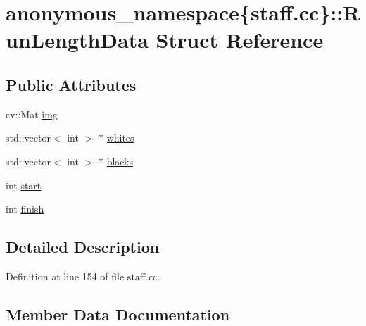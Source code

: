 \hypertarget{structanonymous__namespace_02staff_8cc_03_1_1RunLengthData}{}\section{anonymous\+\_\+namespace\{staff.\+cc\}\+:\+:Run\+Length\+Data Struct Reference}
\label{structanonymous__namespace_02staff_8cc_03_1_1RunLengthData}
\subsection*{Public Attributes}
\begin{DoxyCompactItemize}
\item 
cv\+::\+Mat \hyperlink{structanonymous__namespace_02staff_8cc_03_1_1RunLengthData_a5e1faf2a25c952ac51297388a44af198}{img}
\item 
std\+::vector$<$ int $>$ $\ast$ \hyperlink{structanonymous__namespace_02staff_8cc_03_1_1RunLengthData_a3ed6930a2e526ce64cccba0e86ac8c29}{whites}
\item 
std\+::vector$<$ int $>$ $\ast$ \hyperlink{structanonymous__namespace_02staff_8cc_03_1_1RunLengthData_acac0ba1ce364389ce57220db37036035}{blacks}
\item 
int \hyperlink{structanonymous__namespace_02staff_8cc_03_1_1RunLengthData_a74e9de2cf82afdb5754a7ec5b6c15817}{start}
\item 
int \hyperlink{structanonymous__namespace_02staff_8cc_03_1_1RunLengthData_a4eb4c72887a7a75f3b99c711a7af9638}{finish}
\end{DoxyCompactItemize}


\subsection{Detailed Description}


Definition at line 154 of file staff.\+cc.



\subsection{Member Data Documentation}
